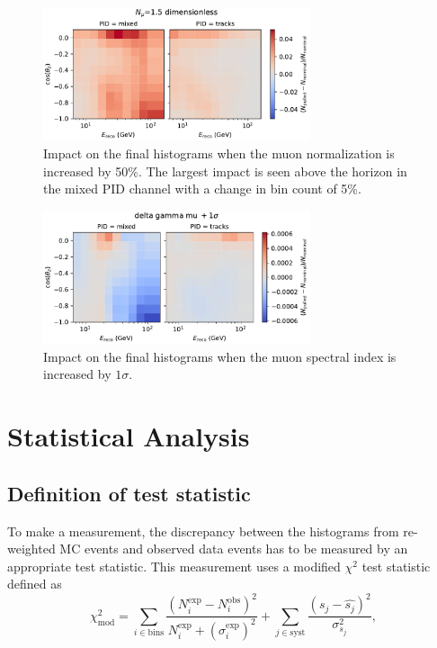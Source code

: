 \begin{figure}[H]
    \centering
    \includegraphics[width=0.7\textwidth,trim={0 0 0 0.6cm},clip]{figures/measurement/systematics/muons/weight_scale.pdf}
    \caption{Impact on the final histograms when the muon normalization is increased by 50\%. The largest impact is seen above the horizon in the mixed PID channel with a change in bin count of 5\%.}
    \label{fig:weight-scale-syst}
\end{figure}

\begin{figure}[H]
    \centering
    \includegraphics[width=0.7\textwidth,trim={0 0 0 0.6cm},clip]{figures/measurement/systematics/muons/delta_gamma_mu.pdf}
    \caption{Impact on the final histograms when the muon spectral index is increased by $1\sigma$.}
    \label{fig:delta-gamma-mu-syst}
\end{figure}

\section{Statistical Analysis}

\subsection{Definition of test statistic}
\label{sec:test-statistic}

To make a measurement, the discrepancy between the histograms from re-weighted MC events and observed data events has to be measured by an appropriate test statistic. This measurement uses a modified $\chi^2$ test statistic defined as
\begin{equation}
\chi^2_{\mathrm{mod}} = \sum_{i \in \mathrm{bins}}^{}\frac{(N^{\mathrm{exp}}_i - N^{\mathrm{obs}}_i)^2}{N^{\mathrm{exp}}_i + (\sigma^{\mathrm{exp}}_i)^2} + \sum_{j \in \mathrm{syst}}^{}\frac{(s_j - \hat{s_j})^2}{\sigma^2_{s_j}},
\label{eq:mod-chi2}
\end{equation}

